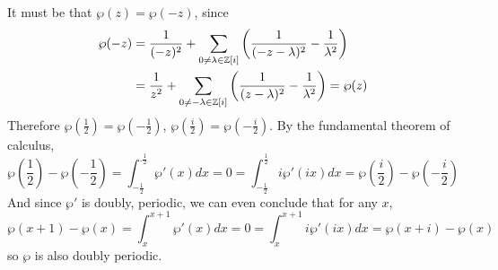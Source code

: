 \documentclass{homework}
\begin{document}
                                                                                                                      \begin{solution}
                                                                                                                      It must be that $\wp(z) = \wp(-z)$, since
                                                                                                                      \begin{align*}
                                                                                                                      \wp(-z) &= \frac{1}{(-z)^2} + \sum_{0 \neq \lambda \in \mathbb{Z}[i]} \left( \frac{1}{(-z - \lambda)^2} - \frac{1}{\lambda^2} \right)\\
                                                                                                                      &= \frac{1}{z^2} + \sum_{0 \neq -\lambda \in \mathbb{Z}[i]} \left( \frac{1}{(z - \lambda)^2} - \frac{1}{\lambda^2} \right) = \wp(z)
                                                                                                                      \end{align*}
                                                                                                                      Therefore $\wp(\frac{1}{2})=\wp(-\frac{1}{2})$, $\wp(\frac{i}{2})=\wp(-\frac{i}{2})$. By the fundamental theorem of calculus,
                                                                                                                      \[
                                                                                                                      \wp(\frac{1}{2}) - \wp(-\frac{1}{2}) = \int_{-\frac{1}{2}}^{.\frac{1}{2}}\wp'(x)dx = 0 = \int_{-\frac{1}{2}}^{\frac{1}{2}} i\wp'(ix)dx =\wp(\frac{i}{2}) - \wp(-\frac{i}{2})
                                                                                                                      \]
                                                                                                                      And since $\wp'$ is doubly, periodic, we can even conclude that for any $x$,
                                                                                                                      \[
                                                                                                                      \wp(x+1) - \wp(x) = \int_{x}^{x+1}\wp'(x)dx = 0 = \int_{x}^{x+1} i\wp'(ix)dx  = \wp(x+i) - \wp(x)
                                                                                                                      \]
                                                                                                                      so $\wp$ is also doubly periodic.

                                                                                                                      \end{solution}
\end{document}
